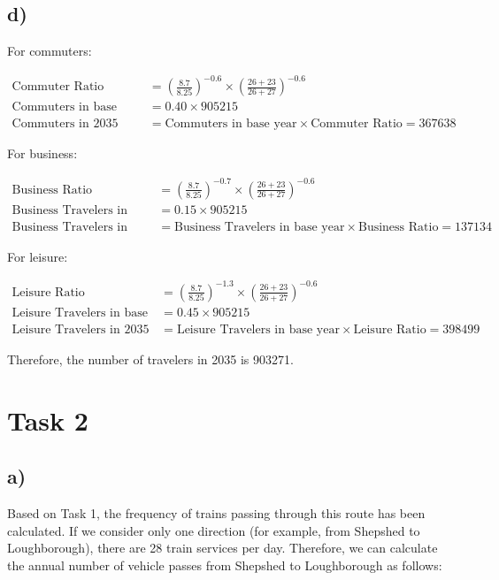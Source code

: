 \documentclass[letterpaper,12pt,leqno]{article}
\begin{document}
	\subsection{d)}\label{d}
	For commuters:
	

	
	\begin{align*}
		\text{Commuter Ratio} & = \left(\frac{8.7}{8.25}\right)^{-0.6} \times \left(\frac{26+23}{26+27}\right)^{-0.6} \\
		\text{Commuters in base year} & = 0.40 \times 905215 \\
		\text{Commuters in 2035} & = \text{Commuters in base year} \times \text{Commuter Ratio} =367638
	\end{align*}
	
	For business:
	
	\begin{align*}
		\text{Business Ratio} & = \left(\frac{8.7}{8.25}\right)^{-0.7} \times \left(\frac{26+23}{26+27}\right)^{-0.6} \\
		\text{Business Travelers in base year} & = 0.15 \times 905215 \\
		\text{Business Travelers in 2035} & = \text{Business Travelers in base year} \times \text{Business Ratio}=137134 
	\end{align*}
	
	For leisure:
	
	\begin{align*}
		\text{Leisure Ratio} & = \left(\frac{8.7}{8.25}\right)^{-1.3} \times \left(\frac{26+23}{26+27}\right)^{-0.6} \\
		\text{Leisure Travelers in base year} & = 0.45 \times 905215 \\
		\text{Leisure Travelers in 2035} & = \text{Leisure Travelers in base year} \times \text{Leisure Ratio}=398499 
	\end{align*}
	
	Therefore, the number of travelers in 2035 is 903271.
	
	\section{Task 2}\label{task-2}
	
	\subsection{a)}
	
	Based on Task 1, the frequency of trains passing through this route has
	been calculated. If we consider only one direction (for example, from
	Shepshed to Loughborough), there are 28 train services per day.
	Therefore, we can calculate the annual number of vehicle passes from
	Shepshed to Loughborough as follows:
	
\end{document}
